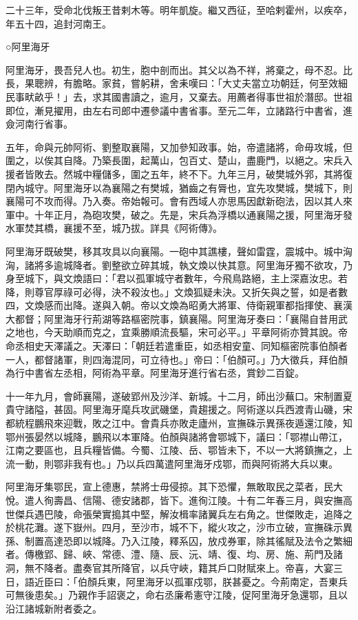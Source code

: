 \begin{pinyinscope}
 二十三年，受命北伐叛王昔剌木等。明年凱旋。繼又西征，至哈剌霍州，以疾卒，年五十四，追封河南王。



 ○阿里海牙



 阿里海牙，畏吾兒人也。初生，胞中剖而出。其父以為不祥，將棄之，母不忍。比長，果聰辨，有膽略。家貧，嘗躬耕，舍耒嘆曰：「大丈夫當立功朝廷，何至效細民事畎畝乎！」去，求其國書讀之，逾月，又棄去。用薦者得事世祖於潛邸。世祖即位，漸見擢用，由左右司郎中遷參議中書省事。至元二年，立諸路行中書省，進僉河南行省事。



 五年，命與元帥阿術、劉整取襄陽，又加參知政事。始，帝遣諸將，命毋攻城，但圍之，以俟其自降。乃築長圍，起萬山，包百丈、楚山，盡鹿門，以絕之。宋兵入援者皆敗去。然城中糧儲多，圍之五年，終不下。九年三月，破樊城外郛，其將復閉內城守。阿里海牙以為襄陽之有樊城，猶齒之有脣也，宜先攻樊城，樊城下，則襄陽可不攻而得。乃入奏。帝始報可。會有西域人亦思馬因獻新砲法，因以其人來軍中。十年正月，為砲攻樊，破之。先是，宋兵為浮橋以通襄陽之援，阿里海牙發水軍焚其橋，襄援不至，城乃拔。詳具《阿術傳》。



 阿里海牙既破樊，移其攻具以向襄陽。一砲中其譙樓，聲如雷霆，震城中。城中洶洶，諸將多逾城降者。劉整欲立碎其城，執文煥以快其意。阿里海牙獨不欲攻，乃身至城下，與文煥語曰：「君以孤軍城守者數年，今飛鳥路絕，主上深嘉汝忠。若降，則尊官厚祿可必得，決不殺汝也。」文煥狐疑未決。又折矢與之誓，如是者數四，文煥感而出降。遂與入朝。帝以文煥為昭勇大將軍、侍衛親軍都指揮使、襄漢大都督；阿里海牙行荊湖等路樞密院事，鎮襄陽。阿里海牙奏曰：「襄陽自昔用武之地也，今天助順而克之，宜乘勝順流長驅，宋可必平。」平章阿術亦贊其說。帝命丞相史天澤議之。天澤曰：「朝廷若遣重臣，如丞相安童、同知樞密院事伯顏者一人，都督諸軍，則四海混同，可立待也。」帝曰：「伯顏可。」乃大徵兵，拜伯顏為行中書省左丞相，阿術為平章。阿里海牙進行省右丞，賞鈔二百錠。



 十一年九月，會師襄陽，遂破郢州及沙洋、新城。十二月，師出沙蕪口。宋制置夏貴守諸隘，甚固。阿里海牙麾兵攻武磯堡，貴趨援之。阿術遂以兵西渡青山磯，宋都統程鵬飛來迎戰，敗之江中。會貴兵亦敗走廬州，宣撫硃示異孫夜遁還江陵，知鄂州張晏然以城降，鵬飛以本軍降。伯顏與諸將會鄂城下，議曰：「鄂襟山帶江，江南之要區也，且兵糧皆備。今蜀、江陵、岳、鄂皆未下，不以一大將鎮撫之，上流一動，則鄂非我有也。」乃以兵四萬遣阿里海牙戍鄂，而與阿術將大兵以東。



 阿里海牙集鄂民，宣上德惠，禁將士毋侵掠。其下恐懼，無敢取民之菜者，民大悅。遣人徇壽昌、信陽、德安諸郡，皆下。進徇江陵。十有二年春三月，與安撫高世傑兵遇巴陵，命張榮實搗其中堅，解汝楫率諸翼兵左右角之。世傑敗走，追降之於桃花灘。遂下嶽州。四月，至沙市，城不下，縱火攻之，沙市立破，宣撫硃示異孫、制置高達恐即以城降。乃入江陵，釋系囚，放戍券軍，除其徭賦及法令之繁細者。傳檄郢、歸、峽、常德、澧、隨、辰、沅、靖、復、均、房、施、荊門及諸洞，無不降者。盡奏官其所降官，以兵守峽，籍其戶口財賦來上。帝喜，大宴三日，語近臣曰：「伯顏兵東，阿里海牙以孤軍戍鄂，朕甚憂之。今荊南定，吾東兵可無後患矣。」乃親作手詔褒之，命右丞廉希憲守江陵，促阿里海牙急還鄂，且以沿江諸城新附者委之。




\end{pinyinscope}
